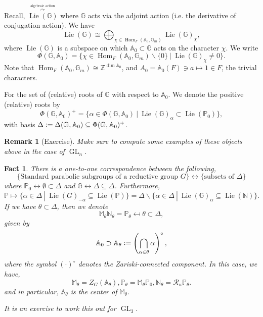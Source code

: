 \documentclass[8pt]{article}
\newtheorem{remark}{Remark}[section]
\newtheorem{fact}{Fact}[section]
\DeclareMathOperator{\GL}{GL}
\DeclareMathOperator{\Hom}{Hom}
\DeclareMathOperator{\Lie}{Lie}
\newcommand{\defeq}{\vcentcolon=}
\newcommand{\N}[0]{\mathbb{N}}
\newcommand{\A}[0]{\mathbb{A}}
\newcommand{\Z}[0]{\mathbb{Z}}
\newcommand{\G}[0]{\mathbb{G}}
\newcommand{\Para}[0]{\mathbb{P}}
\newcommand{\M}[0]{\mathbb{M}}
\newcommand{\sep}[0]{\:|\:}
\begin{document}
Recall, $\stackrel{\stackrel{\text{algebraic action}}{\curvearrowright}}{\Lie(\G)}$ where $\G$ acts via the adjoint action (i.e. the derivative of conjugation action).
We have 
\begin{equation*}
  \Lie(\G) \cong \bigoplus_{\chi\in\Hom_F(\A_0,\G_m)}\Lie(\G)_\chi,
\end{equation*}
where $\Lie(\G)$ is a subspace on which $\A_0\subset\G$ acts on the character $\chi$. We write 
\begin{equation*}
  \Phi(\G,\A_0) = \{\chi\in\Hom_F(\A_0,\G_m)\backslash\{0\}\sep \Lie(\G)_\chi\not=0\}.
\end{equation*}
Note that $\Hom_F(\A_0,\G_m)\cong \Z^{\dim \A_0}$, and $A_0 = \A_0(F)\ni a\mapsto 1\in F$, the trivial characters.
\par For the set of (relative) roots of $\G$ with respect to $\A_0$. We denote the positive (relative) roots by
\begin{equation*}
  \Phi(\G,\A_0)^+ = \{\alpha\in\Phi(\G,\A_0)\sep\Lie(\G)_\alpha \subset\Lie(\Para_0)\},
\end{equation*}
with basis $\Delta \defeq \Delta(\G,\A_0)\subseteq\Phi(\G,\A_0)^+$.
\begin{remark}[Exercise]
  Make sure to compute some examples of these objects above in the case of $\GL_n$.
\end{remark}
\begin{fact}
  \label{fact_47}
  There is a one-to-one correspondence between the following,
  \begin{equation*}
    \{\text{Standard parabolic subgroups of a reductive group $G$}\}\leftrightarrow\{\text{subsets of $\Delta$}\}
  \end{equation*}
  where $\Para_0\leftrightarrow\emptyset\subset\Delta$ and $\G\leftrightarrow\Delta\subseteq\Delta$. Furthermore,
  \begin{equation*}
    \Para\mapsto\{\alpha\in\Delta\sep\Lie(G)_{-\alpha}\subseteq\Lie(\Para)\}=\Delta\backslash\{\alpha\in\Delta\sep \Lie(\G)_\alpha\subseteq \Lie(\N)\}.
  \end{equation*}
  If we have $\theta\subset\Delta$, then we denote 
  \begin{equation*}
    \M_\theta\N_\theta = \Para_\theta \mapsfrom\theta\subset\Delta,
  \end{equation*}
  given by 
  \begin{equation*}
    \A_0\supset\A_\theta\defeq \left(\bigcap_{\alpha\in\theta}\alpha\right)^\circ,
  \end{equation*}
  where the symbol $(\cdot)^\circ$ denotes the Zariski-connected component. In this case, we have,
  \begin{equation*}
    \M_\theta = Z_G(\A_\theta),\Para_\theta = \M_\theta\Para_0,\N_\theta = \mathcal{R}_u\Para_\theta.
  \end{equation*}
  and in particular, $\A_\theta$ is the center of $\M_\theta$. \\
  \par It is an exercise to work this out for $\GL_3$.
\end{fact}
\end{document}
